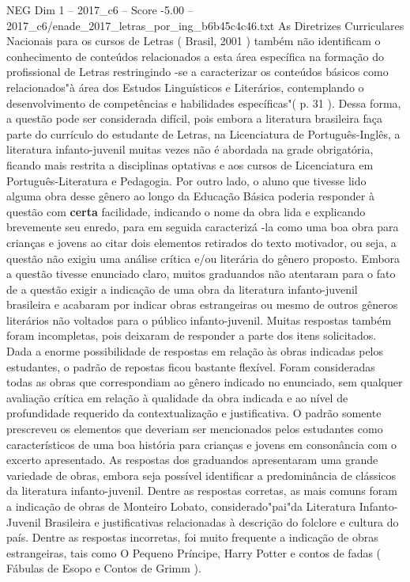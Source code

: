 \begin{textsample}{NEG Dim 1 – 2017\_c6 – Score -5.00 – 2017\_c6/enade\_2017\_letras\_por\_ing\_b6b45c4c46.txt}
As Diretrizes Curriculares Nacionais para os cursos de Letras ( Brasil, 2001 ) também não identificam o conhecimento de conteúdos relacionados a esta área específica na formação do profissional de Letras restringindo -se a caracterizar os conteúdos básicos como relacionados"à área dos Estudos Linguísticos e Literários, contemplando o desenvolvimento de competências e habilidades específicas"( p. 31 ).
Dessa forma, a questão pode ser considerada difícil, pois embora a literatura brasileira faça parte do currículo do estudante de Letras, na Licenciatura de Português-Inglês, a literatura infanto-juvenil muitas vezes não é abordada na grade obrigatória, ficando mais restrita a disciplinas optativas e aos cursos de Licenciatura em Português-Literatura e Pedagogia.
Por outro lado, o aluno que tivesse lido alguma obra desse gênero ao longo da Educação Básica poderia responder à questão com \textbf{certa} facilidade, indicando o nome da obra lida e explicando brevemente seu enredo, para em seguida caracterizá -la como uma boa obra para crianças e jovens ao citar dois elementos retirados do texto motivador, ou seja, a questão não exigiu uma análise crítica e/ou literária do gênero proposto.
Embora a questão tivesse enunciado claro, muitos graduandos não atentaram para o fato de a questão exigir a indicação de uma obra da literatura infanto-juvenil brasileira e acabaram por indicar obras estrangeiras ou mesmo de outros gêneros literários não voltados para o público infanto-juvenil.
Muitas respostas também foram incompletas, pois deixaram de responder a parte dos itens solicitados.
Dada a enorme possibilidade de respostas em relação às obras indicadas pelos estudantes, o padrão de repostas ficou bastante flexível.
Foram consideradas todas as obras que correspondiam ao gênero indicado no enunciado, sem qualquer avaliação crítica em relação à qualidade da obra indicada e ao nível de profundidade requerido da contextualização e justificativa.
O padrão somente prescreveu os elementos que deveriam ser mencionados pelos estudantes como característicos de uma boa história para crianças e jovens em consonância com o excerto apresentado.
As respostas dos graduandos apresentaram uma grande variedade de obras, embora seja possível identificar a predominância de clássicos da literatura infanto-juvenil.
Dentre as respostas corretas, as mais comuns foram a indicação de obras de Monteiro Lobato, considerado"pai"da Literatura Infanto-Juvenil Brasileira e justificativas relacionadas à descrição do folclore e cultura do país.
Dentre as respostas incorretas, foi muito frequente a indicação de obras estrangeiras, tais como O Pequeno Príncipe, Harry Potter e contos de fadas ( Fábulas de Esopo e Contos de Grimm ).

\end{textsample}
